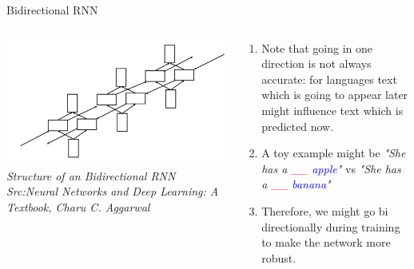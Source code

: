 \begin{frame}{Bidirectional RNN}
	\begin{columns}[T]
        \begin{column}{0.4\textwidth}
        	\includegraphics[width=\textwidth]{images/BiRNN.png}
			\tiny{\textit{Structure of an Bidirectional RNN\\Src:Neural Networks and Deep Learning: A Textbook, Charu C. Aggarwal  }}
        \end{column}
		\begin{column}{0.6\textwidth}
			\begin{enumerate}[$\bullet$]
				\item Note that going in one direction is not always accurate: for languages text which is going to appear later might influence text which is predicted now. 
				\item A toy example might be \textit{"She has  a \textcolor{red}{\_\_} \textcolor{blue}{apple}"} vs \textit{"She has  a \textcolor{red}{\_\_} \textcolor{blue}{banana}"} 
				\item Therefore, we might go bi directionally during training to make the network more robust.
			\end{enumerate}
		\end{column} 
    \end{columns}
\end{frame}

